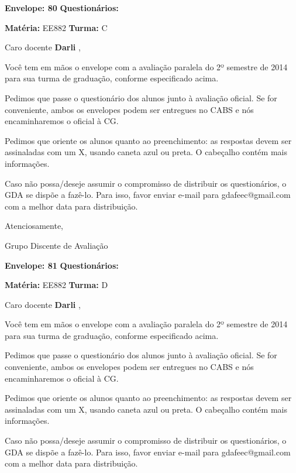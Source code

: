 \documentclass[a5paper]{letter}
\begin{document}
\vspace{0.5cm}

{\bf Envelope: 80 }		\hfill	{\bf Questionários:} \hspace{2cm}

\newpage
\thispagestyle{empty}

\hfill {\bf Matéria:} EE882 {\bf Turma:} C

Caro docente {\bf Darli }, 

	Você tem em mãos o envelope com a avaliação paralela do 2º semestre de 2014 para sua turma de graduação, conforme especificado acima.

	Pedimos que passe o questionário dos alunos junto à avaliação oficial. Se for conveniente, ambos os envelopes podem ser entregues no CABS e nós encaminharemos o oficial à CG.

Pedimos que oriente os alunos quanto ao preenchimento: as respostas devem ser assinaladas com um X, usando caneta azul ou preta. O cabeçalho contém mais informações.

	Caso não possa/deseje assumir o compromisso de distribuir os questionários, o GDA se dispõe a fazê-lo. Para isso, favor enviar e-mail para gdafeec@gmail.com com a melhor data para distribuição.


Atenciosamente, 

Grupo Discente de Avaliação

\vspace{0.5cm}

{\bf Envelope: 81 }		\hfill	{\bf Questionários:} \hspace{2cm}

\newpage
\thispagestyle{empty}

\hfill {\bf Matéria:} EE882 {\bf Turma:} D

Caro docente {\bf Darli }, 

	Você tem em mãos o envelope com a avaliação paralela do 2º semestre de 2014 para sua turma de graduação, conforme especificado acima.

	Pedimos que passe o questionário dos alunos junto à avaliação oficial. Se for conveniente, ambos os envelopes podem ser entregues no CABS e nós encaminharemos o oficial à CG.

Pedimos que oriente os alunos quanto ao preenchimento: as respostas devem ser assinaladas com um X, usando caneta azul ou preta. O cabeçalho contém mais informações.

	Caso não possa/deseje assumir o compromisso de distribuir os questionários, o GDA se dispõe a fazê-lo. Para isso, favor enviar e-mail para gdafeec@gmail.com com a melhor data para distribuição.
\end{document}
